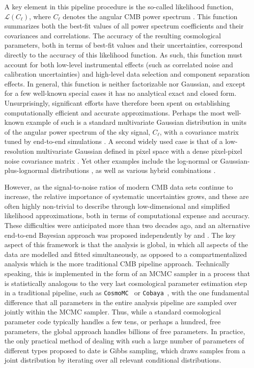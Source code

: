 \documentclass[twocolumn]{../common/aa}
\def\cosmomc{\texttt{CosmoMC}}
\def\cobaya{\texttt{Cobaya}}
\begin{document}
A key element in this pipeline procedure is the so-called likelihood function, $\mathcal{L}(C_{\ell})$, where $C_{\ell}$ denotes the angular CMB power spectrum \citep[e.g.,][]{planck2016-l05}. This function summarizes both the best-fit values of all power spectrum coefficients and their covariances and correlations. The accuracy of the resulting cosmological parameters, both in terms of best-fit values and their uncertainties, correspond directly to the accuracy of this likelihood function. As such, this function must account for both low-level instrumental effects (such as correlated noise and calibration uncertainties) and high-level data selection and component separation effects. In general, this function is neither factorizable nor Gaussian, and except for a few well-known special cases it has no analytical exact and closed form. Unsurprisingly, significant efforts have therefore been spent on establishing computationally efficient and accurate approximations. Perhaps the most well-known example of such is a standard multivariate Gaussian distribution in units of the angular power spectrum of the sky signal, $C_{\ell}$, with a covariance matrix tuned by end-to-end simulations \citep[e.g.,][]{planck2016-l05}. A second widely used case is that of a low-resolution multivariate Gaussian defined in pixel space with a dense pixel-pixel noise covariance matrix \citep{hinshaw2012,planck2016-l05}. Yet other examples include the log-normal or Gaussian-plus-lognormal distributions \citep[e.g.,][]{verde2003}, as well as various hybrid combinations \citep[e.g.,][]{gjerlow2013}. 

However, as the signal-to-noise ratios of modern CMB data sets continue to increase, the relative importance of systematic uncertainties grows, and these are often highly non-trivial to describe through low-dimensional and simplified likelihood approximations, both in terms of computational expense and accuracy. These difficulties were anticipated more than two decades ago, and an alternative end-to-end Bayesian approach was proposed independently by \citet{jewell2004} and \citet{wandelt2004}. The key aspect of this framework is that the analysis is global, in which all aspects of the data are modelled and fitted simultaneously, as opposed to a compartmentalized analysis which is the more traditional CMB pipeline approach. Technically speaking, this is implemented in the form of an MCMC sampler in a process that is statistically analogous to the very last cosmological parameter estimation step in a traditional pipeline, such as \cosmomc\ \citep{cosmomc} or \cobaya\ \citep{Torrado:2020dgo}, with the one fundamental difference that all parameters in the entire analysis pipeline are sampled over jointly within the MCMC sampler. Thus, while a standard cosmological parameter code typically handles a few tens, or perhaps a hundred, free parameters, the global approach handles billions of free parameters. In practice, the only practical method of dealing with such a large number of parameters of different types proposed to date is Gibbs sampling, which draws samples from a joint distribution by iterating over all relevant conditional distributions.
\end{document}
